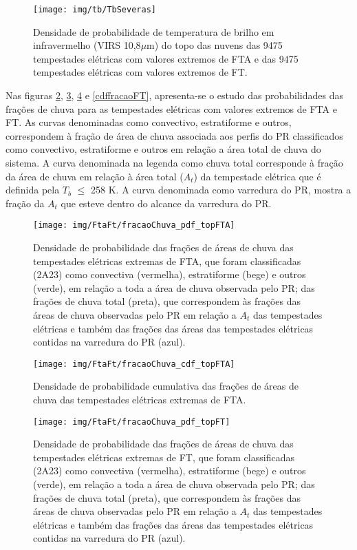 
\begin{figure}[!ht]
  \centering 
  \texttt{[image: img/tb/TbSeveras]}
  \caption{Densidade de probabilidade de temperatura de brilho em infravermelho (VIRS 10,8$\mu$m) do topo das nuvens das 9475 tempestades elétricas com valores extremos de FTA  e das 9475 tempestades elétricas com valores extremos de FT.}
  \label{tb}
\end{figure}


Nas figuras \ref{pdffracaoFTA}, \ref{cdffracaoFTA}, \ref{pdffracaoFT} e  \ref{cdffracaoFT}, apresenta-se o estudo das probabilidades das frações de chuva para as tempestades elétricas com valores extremos de FTA e FT. As curvas denominadas como convectivo, estratiforme e outros, correspondem à fração de área de chuva associada aos perfis do PR classificados como convectivo, estratiforme e outros em relação a área total de chuva do sistema. A curva denominada na legenda como chuva total corresponde à fração da área de chuva em relação à área total ($A_t$) da tempestade elétrica que é definida pela $T_b$ $\leq$ 258 K. A curva denominada como varredura do PR, mostra a fração da $A_t$ que esteve dentro do alcance da varredura do PR.

\begin{figure}[!ht]
  \centering
  \texttt{[image: img/FtaFt/fracaoChuva\_pdf\_topFTA]}   
  \caption{Densidade de probabilidade das frações de áreas de chuva das tempestades elétricas extremas de FTA, que foram classificadas (2A23) como convectiva (vermelha), estratiforme (bege) e outros (verde), em relação a toda a área de chuva observada pelo PR; das frações de chuva total (preta), que correspondem às frações das áreas de chuva observadas pelo PR em relação a $A_t$ das tempestades elétricas e também das frações das áreas das tempestades elétricas contidas na varredura do PR (azul).}
  \label{pdffracaoFTA}  
\end{figure}

\begin{figure}[!ht]
  \centering 
  \texttt{[image: img/FtaFt/fracaoChuva\_cdf\_topFTA]}
  \caption{Densidade de probabilidade cumulativa das frações de áreas de chuva das tempestades elétricas extremas de FTA.}
  \label{cdffracaoFTA}
\end{figure}

\begin{figure}[!ht]
  \centering
  \texttt{[image: img/FtaFt/fracaoChuva\_pdf\_topFT]}   
  \caption{Densidade de probabilidade das frações de áreas de chuva das tempestades elétricas extremas de FT, que foram classificadas (2A23) como convectiva (vermelha), estratiforme (bege) e outros (verde), em relação a toda a área de chuva observada pelo PR; das frações de chuva total (preta), que correspondem às frações das áreas de chuva observadas pelo PR em relação a $A_t$ das tempestades elétricas e também das frações das áreas das tempestades elétricas contidas na varredura do PR (azul).}
  \label{pdffracaoFT}  
\end{figure}

